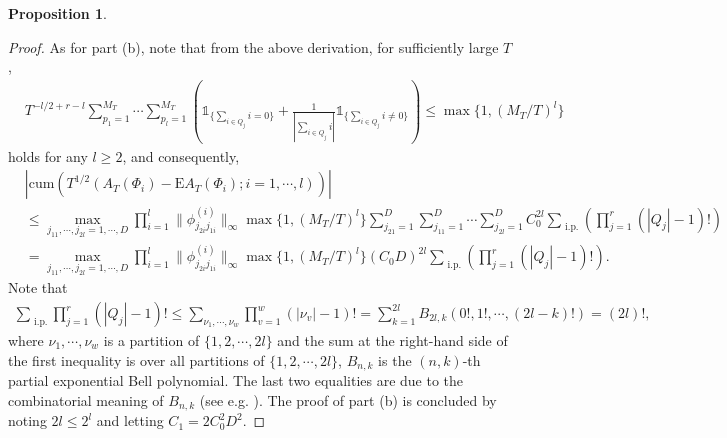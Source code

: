 \documentclass[11pt]{article}
\numberwithin{equation}{section}
\theoremstyle{plain}
\theoremstyle{definition}
\theoremstyle{definition}
\theoremstyle{assumption}
\theoremstyle{proposition}
\newtheorem{proposition}{Proposition}[section]
\theoremstyle{proposition}
\theoremstyle{example}
\theoremstyle{lemma}
\theoremstyle{theorem}
\theoremstyle{remark}
\begin{document}
\begin{proposition}
\begin{proof}
As for part (b), note that from the above derivation, for sufficiently large $T$,
\begin{align*}
&T^{-l/2+r-l}\sum_{p_1=1}^{M_T}\cdots\sum_{p_l=1}^{M_T}  \left( \mathds{1}_{\{\sum_{i\in Q_j}i = 0\}} + \frac{1}{|\sum_{i\in Q_j}i|}\mathds{1}_{\{\sum_{i\in Q_j}i \neq 0\}}\right) 
\leqslant \max\{1, (M_T/T)^{l}\}
\end{align*}
holds for any $l\geqslant 2$, and consequently,
\begin{align*}
&\left|\mathrm{cum}\left(T^{1/2}(A_T(\Phi_i) - \mathrm{E}A_T(\Phi_i);i=1,\cdots,l)\right)\right| \\
&\leqslant \max_{j_{11},\cdots,j_{2l} = 1,\cdots,D}\prod_{i=1}^l\|\phi_{j_{2i} j_{1i}}^{(i)}\|_{\infty}  \max\{1, (M_T/T)^{l}\}
\sum_{j_{21}=1}^D\sum_{j_{11}=1}^D\cdots\sum_{j_{2l}=1}^D C_0^{2l}\sum_{\textrm{ i.p.}}\left(\prod_{j=1}^{r}(|Q_j| - 1)!\right) \\
&= \max_{j_{11},\cdots,j_{2l} = 1,\cdots,D}\prod_{i=1}^l\|\phi_{j_{2i} j_{1i}}^{(i)}\|_{\infty}  \max\{1, (M_T/T)^{l}\}
 (C_0 D)^{2l}\sum_{\textrm{ i.p.}}\left(\prod_{j=1}^{r}(|Q_j| - 1)!\right).
\end{align*}
Note that 
\begin{align*}
\sum_{\textrm{ i.p.}}\prod_{j=1}^{r}(|Q_j|-1)!
\leqslant \sum_{\nu_1,\cdots,\nu_w}\prod_{v=1}^{w}(|\nu_v|-1)!
= \sum_{k=1}^{2l} B_{2l,k}(0!,1!,\cdots,(2l -k)!)=(2l)!,
\end{align*}
where $\nu_1,\cdots,\nu_w$ is a partition of $\{1,2,\cdots,2l\}$ and the sum at the right-hand side of the first inequality is over all partitions of $\{1,2,\cdots,2l\}$, $B_{n,k}$ is the $(n,k)$-th partial exponential Bell polynomial. The last two equalities are due to the combinatorial meaning of $B_{n,k}$ (see e.g. \citet[pp. 95--97]{BellPolynomial-encyc-maths}). The proof of part (b) is concluded by noting $2l\leqslant 2^l$ and letting $C_1 = 2C_0^2 D^2$.


\end{proof}
\end{proposition}
\end{document}
